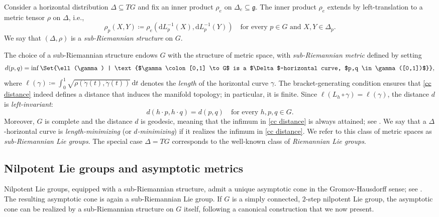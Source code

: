 \documentclass[a4paper,11pt,reqno]{amsart}
\theoremstyle{plain}
\theoremstyle{definition}
\newcommand{\g}{\mathfrak{g}}
\newcommand{\id}{e}
\newcommand{\de}{\mathrm{d}}
\newcommand{\coloneq}{\coloneqq}
\begin{document}
	Consider a horizontal distribution $\Delta \subseteq TG$ and fix an inner product $\rho_\id$ on $\Delta_\id \subseteq \g$. The inner product $\rho_\id$ extends by left-translation to a metric tensor $\rho$ on $\Delta$, i.e.,
	\begin{equation*}
		\rho_p(X,Y) \coloneq \rho_\id(\de L_p^{-1}(X),\de L_p^{-1}(Y)) \quad \text{for every $p \in G$ and $X,Y \in \Delta_p$.}
	\end{equation*}
	We say that $(\Delta,\rho)$ is a \emph{sub-Riemannian structure} on $G$. %
	
	The choice of a sub-Riemannian structure endows $G$ with the structure of metric space, with \emph{sub-Riemannian metric} defined by setting
	\begin{equation} \label{cc distance}
		d(p,q) = \inf \Set{\ell(\gamma) | \text{$\gamma \colon [0,1] \to G$ is a $\Delta$-horizontal curve, $p,q \in \gamma([0,1])$}},
	\end{equation}
	where $\ell(\gamma)\coloneq\int_0^1 \sqrt{\rho(\dot{\gamma}(t),\dot{\gamma}(t))} \, \de t$ denotes the \emph{length} of the horizontal curve $\gamma$.
	The bracket-generating condition ensures that \eqref{cc distance} indeed defines a distance that induces the manifold topology; in particular, it is finite. Since $\ell(L_h \circ \gamma)=\ell(\gamma)$, the distance $d$ is \emph{left-invariant}:
	\begin{equation*}
		d(h \cdot p,h \cdot q)=d(p,q) \quad \text{for every $h,p,q \in G$.}
	\end{equation*} 	
	Moreover, $G$ is complete and the distance $d$ is geodesic, meaning that the infimum in \eqref{cc distance} is always attained; see \cite[Theorem~7.1.7]{donne2024metricliegroupscarnotcaratheodory}. We say that a $\Delta$-horizontal curve is \emph{length-minimizing} (or \emph{$d$-minimizing}) if it realizes the infimum in \eqref{cc distance}.
	We refer to this class of metric spaces as \emph{sub-Riemannian Lie groups}. The special case $\Delta=TG$ corresponds to the well-known class of \emph{Riemannian Lie groups}. %

	\subsection{Nilpotent Lie groups and asymptotic metrics} \label{section_asymptotic_metric}
 Nilpotent Lie groups, equipped with a sub-Riemannian structure, admit a unique asymptotic cone in the Gromov-Hausdorff sense; see \cite{MR741395}. The resulting asymptotic cone is again a sub-Riemannian Lie group. If $G$ is a simply connected, $2$-step nilpotent Lie group, the asymptotic cone can be realized by a sub-Riemannian structure on $G$ itself, following a canonical construction that we now present.
	
\end{document}
